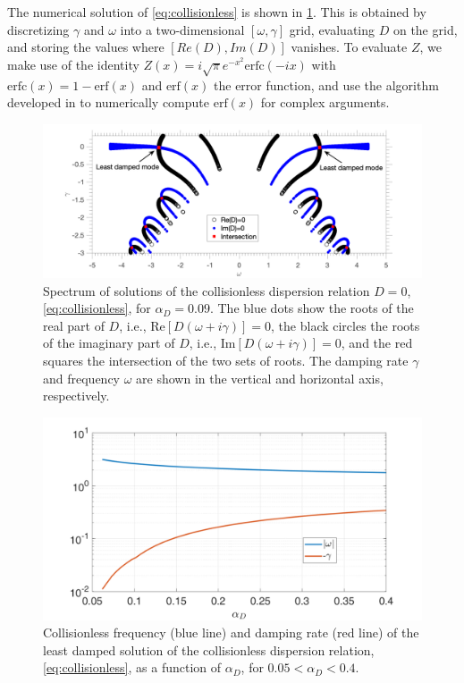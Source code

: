 The numerical solution of \cref{eq:collisionless} is shown in \cref{fig:colless_spectrum}.
%
This is obtained by discretizing $\gamma$ and $\omega$ into a two-dimensional $[\omega,\gamma]$ grid, evaluating $D$ on the grid, and storing the values where $[Re(D),Im(D)]$ vanishes.
%
To evaluate $Z$, we make use of the identity $Z(x)=i \sqrt{\pi} e^{-x^2}\text{erfc}{(-i x)}$ with $\text{erfc}{( x)}=1-\text{erf}(x)$ and $\text{erf}(x)$ the error function, and use the algorithm developed in \citet{Gautschi1970} to numerically compute $\text{erf}(x)$ for complex arguments.
%
\begin{figure}
    \centering
    \includegraphics[width=.85\textwidth]{images/colless_spectrum.pdf}
    \caption{Spectrum of solutions of the collisionless dispersion relation $D=0$, \cref{eq:collisionless}, for $\alpha_D=0.09$. The blue dots show the roots of the real part of $D$, {i.e., Re$[D(\omega+i \gamma)]=0$}, the black circles the roots of the imaginary part of $D$, {i.e., Im$[D(\omega+i \gamma)]=0$}, and the red squares the intersection of the two sets of roots. The damping rate $\gamma$ and frequency $\omega$ are shown in the vertical and horizontal axis, respectively.
    }
    \label{fig:colless_spectrum}
\end{figure}

\begin{figure}
    \centering
    \includegraphics[width=.80\textwidth]{images/Collisionless_EPW_gammaomega_vs_alphaD.pdf}
    \caption{Collisionless frequency {(blue line)} and damping rate {(red line)} of the least damped {solution of the collisionless dispersion relation, \cref{eq:collisionless},} as a function of $\alpha_D$, for $0.05<\alpha_D<0.4$.}
    \label{fig:colless_alphad}
\end{figure}

